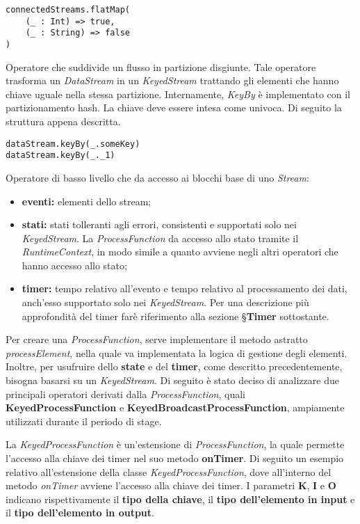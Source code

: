 \begin{verbatim}
connectedStreams.flatMap(
    (_ : Int) => true,
    (_ : String) => false
)
\end{verbatim}

Operatore che suddivide un flusso in partizione disgiunte. Tale operatore trasforma un \textit{DataStream} in un \textit{KeyedStream} trattando gli elementi che hanno chiave uguale nella stessa partizione. Internamente, \textit{KeyBy} è implementato con il partizionamento hash.
La chiave deve essere intesa come univoca.
Di seguito la struttura appena descritta.
\begin{verbatim}
dataStream.keyBy(_.someKey)
dataStream.keyBy(_._1)
\end{verbatim}

Operatore di basso livello che da accesso ai blocchi base di uno \textit{Stream}:
\begin{itemize}
	\item{\textbf{eventi:} elementi dello stream;}
	\item{\textbf{stati:} stati tolleranti agli errori, consistenti e supportati solo nei \textit{KeyedStream}. La \textit{ProcessFunction} da accesso allo stato tramite il \textit{RuntimeContext}, in modo simile a quanto avviene negli altri operatori che hanno accesso allo stato;}
	\item{\textbf{timer:} tempo relativo all'evento e tempo relativo al processamento dei dati, anch'esso supportato solo nei \textit{KeyedStream}. Per una descrizione più approfondità del timer farè riferimento alla sezione \S\textbf{Timer} sottostante.}
\end{itemize}

Per creare una \textit{ProcessFunction}, serve implementare il metodo astratto \textit{processElement}, nella quale va implementata la logica di gestione degli elementi. Inoltre, per usufruire dello \textbf{state} e del \textbf{timer}, come descritto precedentemente, bisogna basarsi su un \textit{KeyedStream}. Di seguito è stato deciso di analizzare due principali operatori derivati dalla \textit{ProcessFunction}, quali \textbf{KeyedProcessFunction} e \textbf{KeyedBroadcastProcessFunction}, ampiamente utilizzati durante il periodo di stage.

La \textit{KeyedProcessFunction} è un'estensione di \textit{ProcessFunction}, la quale permette l'accesso alla chiave dei timer nel suo metodo \textbf{onTimer}. Di seguito un esempio relativo all'estensione della classe \textit{KeyedProcessFunction}, dove all'interno del metodo \textit{onTimer} avviene l'accesso alla chiave dei timer. I parametri \textbf{K}, \textbf{I} e \textbf{O} indicano rispettivamente il \textbf{tipo della chiave}, il \textbf{tipo dell'elemento in input} e il \textbf{tipo dell'elemento in output}.

